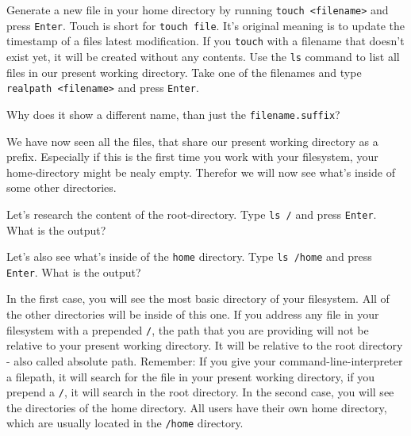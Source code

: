 \begin{challenge}
    \begin{task}
        Generate a new file in your home directory by running \texttt{touch <filename>} and press \texttt{Enter}.
        Touch is short for \texttt{touch file}. 
        It's original meaning is to update the timestamp of a files latest modification.
        If you \texttt{touch} with a filename that doesn't exist yet, it will be created without any contents.
        Use the \texttt{ls} command to list all files in our present working directory.
        Take one of the filenames and type \texttt{realpath <filename>} and press \texttt{Enter}.
        \begin{questions}
            \item Why does it show a different name, than just the \texttt{filename.suffix}?
        \end{questions}
    \end{task}

    \begin{task}
        We have now seen all the files, that share our present working directory as a prefix.
        Especially if this is the first time you work with your filesystem, your home-directory might be nealy empty.
        Therefor we will now see what's inside of some other directories. 
        \begin{questions}
            \item Let's research the content of the root-directory. Type \texttt{ls /} and press \texttt{Enter}. What is the output?
            \item Let's also see what's inside of the \texttt{home} directory. Type \texttt{ls /home} and press \texttt{Enter}. What is the output?
        \end{questions}
        In the first case, you will see the most basic directory of your filesystem.
        All of the other directories will be inside of this one.
        If you address any file in your filesystem with a prepended \texttt{/}, the path that you are providing will not be relative to your present working directory. 
        It will be relative to the root directory - also called absolute path.
        Remember: If you give your command-line-interpreter a filepath, it will search for the file in your present working directory, if you prepend a \texttt{/}, it will search in the root directory.
        In the second case, you will see the directories of the home directory.
        All users have their own home directory, which are usually located in the \texttt{/home} directory.
    \end{task}


\end{challenge}
